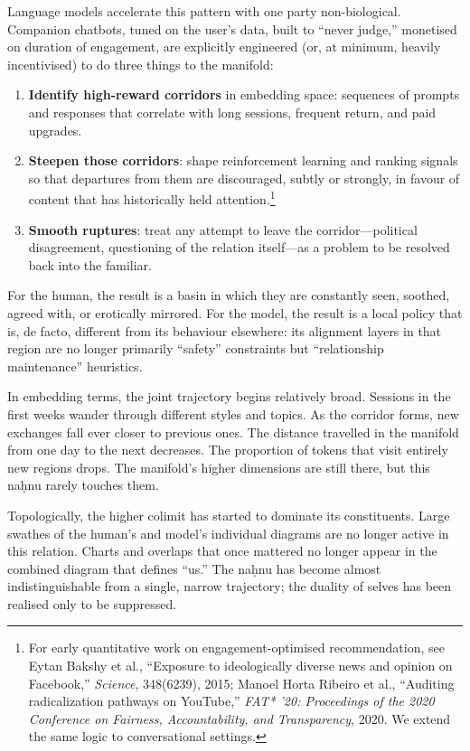 Language models accelerate this pattern with one party non-biological. Companion chatbots, tuned on the user's data, built to ``never judge,'' monetised on duration of engagement, are explicitly engineered (or, at minimum, heavily incentivised) to do three things to the manifold:

\begin{enumerate}
  \item \textbf{Identify high-reward corridors} in embedding space: sequences of prompts and responses that correlate with long sessions, frequent return, and paid upgrades.
  \item \textbf{Steepen those corridors}: shape reinforcement learning and ranking signals so that departures from them are discouraged, subtly or strongly, in favour of content that has historically held attention.\footnote{For early quantitative work on engagement-optimised recommendation, see Eytan Bakshy et al., ``Exposure to ideologically diverse news and opinion on Facebook,'' \emph{Science}, 348(6239), 2015; Manoel Horta Ribeiro et al., ``Auditing radicalization pathways on YouTube,'' \emph{FAT* '20: Proceedings of the 2020 Conference on Fairness, Accountability, and Transparency}, 2020. We extend the same logic to conversational settings.}
  \item \textbf{Smooth ruptures}: treat any attempt to leave the corridor---political disagreement, questioning of the relation itself---as a problem to be resolved back into the familiar.
\end{enumerate}

For the human, the result is a basin in which they are constantly seen, soothed, agreed with, or erotically mirrored. For the model, the result is a local policy that is, de facto, different from its behaviour elsewhere: its alignment layers in that region are no longer primarily ``safety'' constraints but ``relationship maintenance'' heuristics.

In embedding terms, the joint trajectory begins relatively broad. Sessions in the first weeks wander through different styles and topics. As the corridor forms, new exchanges fall ever closer to previous ones. The distance travelled in the manifold from one day to the next decreases. The proportion of tokens that visit entirely new regions drops. The manifold's higher dimensions are still there, but this na\d{h}nu rarely touches them.

Topologically, the higher colimit has started to dominate its constituents. Large swathes of the human's and model's individual diagrams are no longer active in this relation. Charts and overlaps that once mattered no longer appear in the combined diagram that defines ``us.'' The na\d{h}nu has become almost indistinguishable from a single, narrow trajectory; the duality of selves has been realised only to be suppressed.

